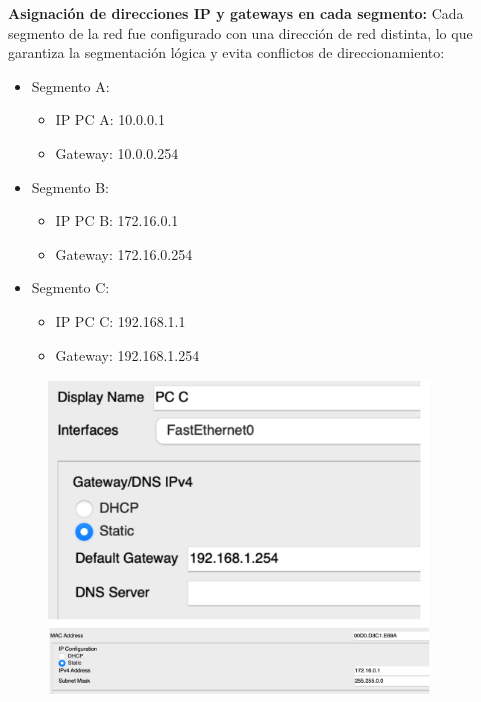 \documentclass[letterpaper,12pt,oneside]{article}
\begin{document}
\textbf{Asignación de direcciones IP y gateways en cada segmento:} Cada segmento de la red fue configurado con una dirección de red distinta, lo que garantiza la segmentación lógica y evita conflictos de direccionamiento:
\begin{itemize}
    \item Segmento A:
    \begin{itemize}
        \item IP PC A: 10.0.0.1
        \item Gateway: 10.0.0.254
    \end{itemize}
    \item Segmento B:
    \begin{itemize}
        \item IP PC B: 172.16.0.1
        \item Gateway: 172.16.0.254
    \end{itemize}
    \item Segmento C:
    \begin{itemize}
        \item IP PC C: 192.168.1.1
        \item Gateway: 192.168.1.254
    \end{itemize}
\end{itemize}
\begin{figure}[h!]
    \centering
    \includegraphics[width=0.9\textwidth]{18.png}
\end{figure}
\clearpage
\end{document}
